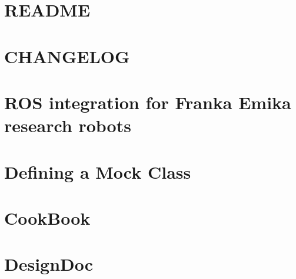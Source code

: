 \documentclass[twoside]{book}
\newcommand{\+}{\discretionary{\mbox{\scriptsize$\hookleftarrow$}}{}{}}
\begin{document}
\chapter{R\+E\+A\+D\+ME}
\label{md_smacc_sm_reference_library_sm_packml_README}

\chapter{C\+H\+A\+N\+G\+E\+L\+OG}
\label{md_smacc_sm_reference_library_sm_panda_moveit_franka_ros_CHANGELOG}

\chapter{R\+OS integration for Franka Emika research robots}
\label{md_smacc_sm_reference_library_sm_panda_moveit_franka_ros_README}

\chapter{Defining a Mock Class}
\label{md_smacc_sm_reference_library_sm_panda_moveit_libfranka_3rdparty_googletest_googlemock_docs_CheatSheet}

\chapter{Cook\+Book}
\label{md_smacc_sm_reference_library_sm_panda_moveit_libfranka_3rdparty_googletest_googlemock_docs_CookBook}

\chapter{Design\+Doc}
\label{md_smacc_sm_reference_library_sm_panda_moveit_libfranka_3rdparty_googletest_googlemock_docs_DesignDoc}

\end{document}

